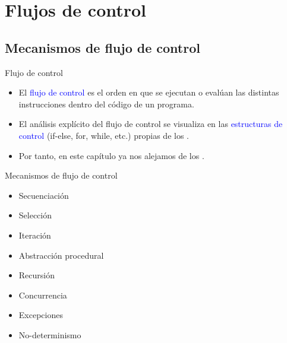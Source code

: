 \documentclass[handout]{beamer} %
\newcommand{\blue}[1]{\textcolor{blue}{#1}}
\newcommand{\redb}[1]{{\color{red!70!black}{#1}}}
\begin{document}

\section{Flujos de control}

\subsection{Mecanismos de flujo de control}

\begin{frame}{Flujo de control}
  \begin{itemize}
    \item<1-> El \blue{flujo de control} es el orden en que se ejecutan o evalúan las distintas instrucciones dentro del código de un programa.
    \item<2-> El análisis explícito del flujo de control se visualiza en las \blue{estructuras de control} (if-else, for, while, etc.) propias de los \redb{lenguajes imperativos}.
    \item<3-> Por tanto, en este capítulo ya nos alejamos de los \redb{lenguajes declarativos}.
  \end{itemize}
\end{frame}

\begin{frame}{Mecanismos de flujo de control}
  \begin{itemize}
    \item Secuenciación
    \item Selección
    \item Iteración
    \item Abstracción procedural
    \item Recursión
    \item Concurrencia
    \item Excepciones
    \item No-determinismo
  \end{itemize}
\end{frame}
\end{document}
